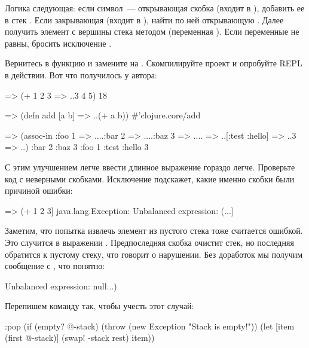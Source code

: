 Логика следующая: если символ~--- открывающая скобка (входит в ), добавить ее в стек . Если закрывающая (входит в ), найти по ней открывающую . Далее получить элемент с вершины стека методом  (переменная ). Если переменные не равны, бросить исключение .

Вернитесь в функцию  и замените  на . Скомпилируйте проект и опробуйте REPL в действии. Вот что получилось у автора:

\begin{english}
  \begin{clojure}
=> (+ 1 2 3
=> ..3 4 5)
18

=> (defn add [a b]
=> ..(+ a b))
#'clojure.core/add

=> (assoc-in {:foo 1
=> ....:bar 2
=> ....:baz 3
=> ....}
=> ..[:test :hello]
=> ..3
=> ..)
{:bar 2 :baz 3 :foo 1 :test {:hello 3}}
  \end{clojure}
\end{english}

С этим улучшением легче ввести длинное выражение гораздо легче. Проверьте код с неверными скобками. Исключение подскажет, какие именно скобки были причиной ошибки:

\begin{english}
  \begin{clojure}
=> (+ 1 2 3]
java.lang.Exception: Unbalanced expression: (...]
  \end{clojure}
\end{english}

Заметим, что попытка извлечь элемент из пустого стека тоже считается ошибкой. Это случится в выражении . Предпоследняя скобка очистит стек, но последняя обратится к пустому стеку, что говорит о нарушении. Без доработок мы получим сообщение с , что понятно:

\begin{english}
  \begin{clojure}
Unbalanced expression: null...)
  \end{clojure}
\end{english}

Перепишем команду  так, чтобы учесть этот случай:

\begin{english}
  \begin{clojure}
:pop (if (empty? @-stack)
       (throw (new Exception "Stack is empty!"))
       (let [item (first @-stack)]
         (swap! -stack rest)
         item))
  \end{clojure}
\end{english}

